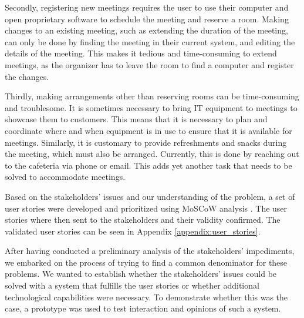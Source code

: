Secondly, registering new meetings requires the user to use their computer and open proprietary software to schedule the meeting and reserve a room.
Making changes to an existing meeting, such as extending the duration of the meeting, can only be done by finding the meeting in their current system, and editing the details of the meeting.
This makes it tedious and time-consuming to extend meetings, as the organizer has to leave the room to find a computer and register the changes.

Thirdly, making arrangements other than reserving rooms can be time-consuming and troublesome. 
It is sometimes necessary to bring IT equipment to meetings to showcase them to customers.
This means that it is necessary to plan and coordinate where and when equipment is in use to ensure that it is available for meetings. 
Similarly, it is customary to provide refreshments and snacks during the meeting, which must also be arranged. 
Currently, this is done by reaching out to the cafeteria via phone or email.
This adds yet another task that needs to be solved to accommodate meetings.

Based on the stakeholders' issues and our understanding of the problem, a set of user stories were developed and prioritized using MoSCoW analysis \cite{DEBbook}.
The user stories where then sent to the stakeholders and their validity confirmed.  
The validated user stories can be seen in Appendix \ref{appendix:user_stories}.

After having conducted a preliminary analysis of the stakeholders' impediments, we embarked on the process of trying to find a common denominator for these problems.
We wanted to establish whether the stakeholders' issues could be solved with a system that fulfills the user stories or whether additional technological capabilities were necessary. 
To demonstrate whether this was the case, a prototype was used to test interaction and opinions of such a system.